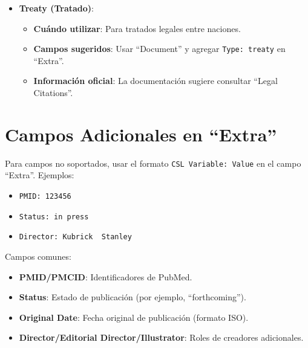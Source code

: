 \documentclass[
  jou,
  floatsintext,
  longtable,
  a4paper,
  nolmodern,
  notxfonts,
  notimes,
  12pt,
  colorlinks=true,linkcolor=blue,citecolor=blue,urlcolor=blue]{apa7}
\providecommand{\tightlist}{%
  \setlength{\itemsep}{0pt}\setlength{\parskip}{0pt}}
\begin{document}
\begin{itemize}
  \begin{itemize}
  \tightlist
  \item
    \textbf{Cuándo utilizar}: Para reseñas de libros publicadas.
  \item
    \textbf{Campos sugeridos}: Usar ``Journal Article'', ``Magazine
    Article'' o ``Newspaper Article'' con ``Reviewed Author'' y agregar
    \texttt{Type:\ review-book} en ``Extra''.
  \item
    \textbf{Información oficial}: La documentación recomienda
    especificar ``Reviewed Title'' en ``Extra''.
  \end{itemize}
\item
  \textbf{Treaty (Tratado)}:

  \begin{itemize}
  \tightlist
  \item
    \textbf{Cuándo utilizar}: Para tratados legales entre naciones.
  \item
    \textbf{Campos sugeridos}: Usar ``Document'' y agregar
    \texttt{Type:\ treaty} en ``Extra''.
  \item
    \textbf{Información oficial}: La documentación sugiere consultar
    ``Legal Citations''.
  \end{itemize}
\end{itemize}

\section{Campos Adicionales en
``Extra''}\label{campos-adicionales-en-extra}

Para campos no soportados, usar el formato
\texttt{CSL\ Variable:\ Value} en el campo ``Extra''. Ejemplos:

\begin{itemize}
\tightlist
\item
  \texttt{PMID:\ 123456}
\item
  \texttt{Status:\ in\ press}
\item
  \texttt{Director:\ Kubrick\ \textbar{}\textbar{}\ Stanley}
\end{itemize}

Campos comunes:

\begin{itemize}
\tightlist
\item
  \textbf{PMID/PMCID}: Identificadores de PubMed.
\item
  \textbf{Status}: Estado de publicación (por ejemplo, ``forthcoming'').
\item
  \textbf{Original Date}: Fecha original de publicación (formato ISO).
\item
  \textbf{Director/Editorial Director/Illustrator}: Roles de creadores
  adicionales.
\end{itemize}
\end{document}
